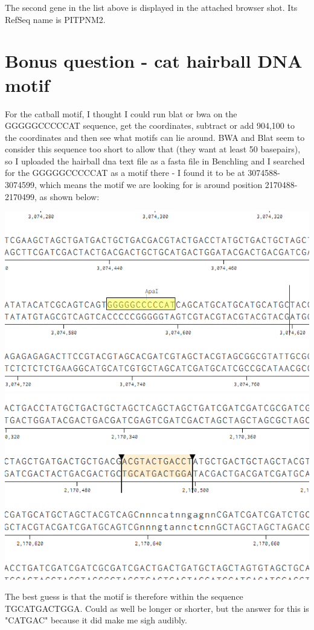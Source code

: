 \documentclass[a4paper,11pt]{article}
\begin{document}
The second gene in the list above is displayed in the attached browser shot. Its RefSeq name is PITPNM2.\\

\section{Bonus question - cat hairball DNA motif}

For the catball motif, I thought I could run blat or bwa on the GGGGGCCCCCAT sequence, get the coordinates, subtract or add 904,100 to the coordinates and then see what motifs can lie around.
BWA and Blat seem to consider this sequence too short to allow that (they want at least 50 basepairs), so I uploaded the hairball dna text file as a fasta file in Benchling and I searched for the GGGGGCCCCCAT as a motif there - I found it to be at 3074588-3074599, which means the motif we are looking for is around position 2170488-2170499, as shown below:

\begin{center}
\includegraphics{ss0.png}
\hline
\hline
\includegraphics{ss1.png}
\end{center}

The best guess is that the motif is therefore within the sequence TGCATGACTGGA. Could as well be longer or shorter, but the answer for this is "CATGAC" because it did make me sigh audibly.
\end{document}
